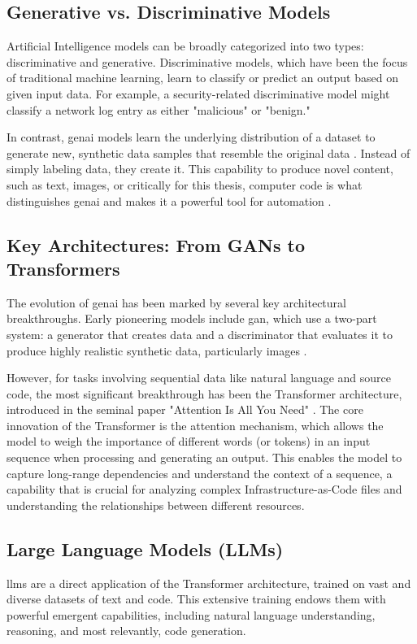 \subsection{Generative vs. Discriminative Models}
Artificial Intelligence models can be broadly categorized into two types: discriminative and generative. Discriminative models, which have been the focus of traditional machine learning, learn to classify or predict an output based on given input data. For example, a security-related discriminative model might classify a network log entry as either "malicious" or "benign."

In contrast, \gls{genai} models learn the underlying distribution of a dataset to generate new, synthetic data samples that resemble the original data \cite{kaswan_generative_2023}. Instead of simply labeling data, they create it. This capability to produce novel content, such as text, images, or critically for this thesis, computer code is what distinguishes \gls{genai} and makes it a powerful tool for automation \cite{gatla_advancements_2024}.

\subsection{Key Architectures: From GANs to Transformers}
The evolution of \gls{genai} has been marked by several key architectural breakthroughs. Early pioneering models include \gls{gan}, which use a two-part system: a generator that creates data and a discriminator that evaluates it to produce highly realistic synthetic data, particularly images \cite{goodfellow_generative_2014}.

However, for tasks involving sequential data like natural language and source code, the most significant breakthrough has been the Transformer architecture, introduced in the seminal paper "Attention Is All You Need" \cite{vaswani_attention_2023}. The core innovation of the Transformer is the attention mechanism, which allows the model to weigh the importance of different words (or tokens) in an input sequence when processing and generating an output. This enables the model to capture long-range dependencies and understand the context of a sequence, a capability that is crucial for analyzing complex Infrastructure-as-Code files and understanding the relationships between different resources.

\subsection{Large Language Models (LLMs)}
\glspl{llm} are a direct application of the Transformer architecture, trained on vast and diverse datasets of text and code. This extensive training endows them with powerful emergent capabilities, including natural language understanding, reasoning, and most relevantly, code generation.

